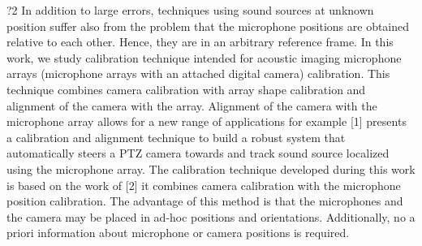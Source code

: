 ?2
In addition to large errors, techniques using sound sources at unknown position suffer also from the problem that the microphone positions are obtained relative to each other. Hence, they are in an arbitrary reference frame.
In this work, we study calibration technique intended for acoustic imaging microphone arrays (microphone arrays with an attached digital camera) calibration. This technique combines camera calibration with array shape calibration and alignment of the camera with the array.
Alignment of the camera with the microphone array allows for a new range of applications for example [1] presents a calibration and alignment technique to build a robust system that automatically steers a PTZ camera towards and track sound source localized using the microphone array.
The calibration technique developed during this work is based on the work of [2] it combines camera calibration with the microphone position calibration. The advantage of this method is that the microphones and the camera may be placed in ad-hoc positions and orientations. Additionally, no a priori information about microphone or camera positions is required.

